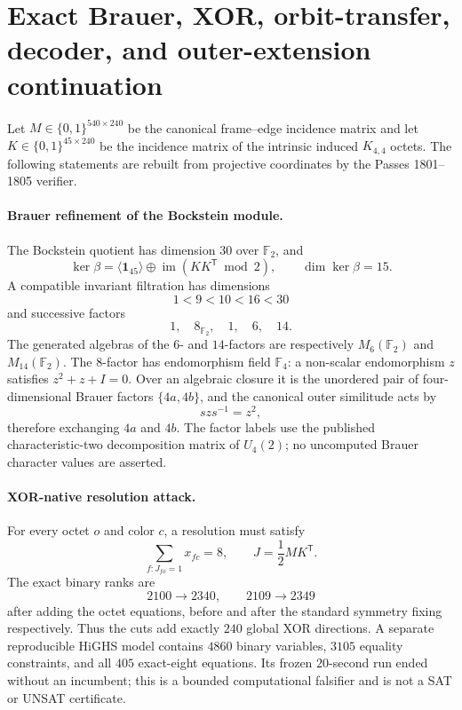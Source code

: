 \section*{Exact Brauer, XOR, orbit-transfer, decoder, and outer-extension continuation}

Let $M\in\{0,1\}^{540\times240}$ be the canonical frame--edge incidence
matrix and let $K\in\{0,1\}^{45\times240}$ be the incidence matrix of the
intrinsic induced $K_{4,4}$ octets.  The following statements are rebuilt from
projective coordinates by the Passes 1801--1805 verifier.

\paragraph{Brauer refinement of the Bockstein module.}
The Bockstein quotient has dimension $30$ over $\mathbb F_2$, and
\[
 \ker\beta
 =\langle\mathbf 1_{45}\rangle
  \oplus\operatorname{im}(KK^{\mathsf T}\bmod2),
 \qquad \dim\ker\beta=15.
\]
A compatible invariant filtration has dimensions
\[
 1<9<10<16<30
\]
and successive factors
\[
 1,\quad 8_{\mathbb F_2},\quad 1,\quad 6,\quad 14.
\]
The generated algebras of the $6$- and $14$-factors are respectively
$M_6(\mathbb F_2)$ and $M_{14}(\mathbb F_2)$.  The $8$-factor has
endomorphism field $\mathbb F_4$: a non-scalar endomorphism $z$ satisfies
$z^2+z+I=0$.  Over an algebraic closure it is the unordered pair of
four-dimensional Brauer factors $\{4a,4b\}$, and the canonical outer
similitude acts by
\[
 szs^{-1}=z^2,
\]
therefore exchanging $4a$ and $4b$.  The factor labels use the published
characteristic-two decomposition matrix of $U_4(2)$; no uncomputed Brauer
character values are asserted.

\paragraph{XOR-native resolution attack.}
For every octet $o$ and color $c$, a resolution must satisfy
\[
 \sum_{f:J_{fo}=1}x_{fc}=8,
 \qquad J=\frac12MK^{\mathsf T}.
\]
The exact binary ranks are
\[
 2100\longrightarrow2340,
 \qquad
 2109\longrightarrow2349
\]
after adding the octet equations, before and after the standard symmetry
fixing respectively.  Thus the cuts add exactly $240$ global XOR directions.
A separate reproducible HiGHS model contains $4860$ binary variables, $3105$
equality constraints, and all $405$ exact-eight equations.  Its frozen
$20$-second run ended without an incumbent; this is a bounded computational
falsifier and is not a SAT or UNSAT certificate.

